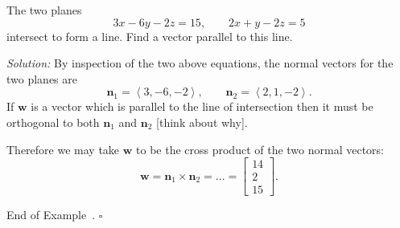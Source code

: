 \documentclass[10pt]{article}
\theoremstyle{definition}
\newtheorem{example}[theorem]{Example}
\renewenvironment{example}
{\begin{oldexample}}
  {\par\smallskip\hfill   End of Example~\theexample. $\square$    \par\end{oldexample}}
\newcommand{\1}[1]{\textbf{1}_{\left[#1\right]}} %
\begin{document}
\begin{example}
  The two planes
  \begin{equation*}
    3x-6y-2z = 15, \qquad 2x+y-2z=5
  \end{equation*}
  intersect to form a line. Find a vector parallel to this line.

  \textit{Solution:} By inspection of the two above equations, the normal
  vectors for the two planes are
  \begin{equation*}
    \boldsymbol{n}_{1} = \left\langle 3,-6,-2 \right\rangle, \qquad \boldsymbol{n}_{2}=\left\langle 2,1,-2 \right\rangle.
  \end{equation*}
  If $\boldsymbol{w}$ is a vector which is parallel to the line of
  intersection then it must be orthogonal to both $\boldsymbol{n}_{1}$ and
  $\boldsymbol{n}_{2}$ [think about why].

  Therefore we may take $\boldsymbol{w}$ to be the cross product of the two
  normal vectors:
  \begin{equation*}
    \boldsymbol{w} 
    = \boldsymbol{n}_{1}\times \boldsymbol{n}_{2} 
    = ... =
    \begin{bmatrix}
      14\\2\\15
    \end{bmatrix}.
  \end{equation*}
\end{example}
\end{document}
